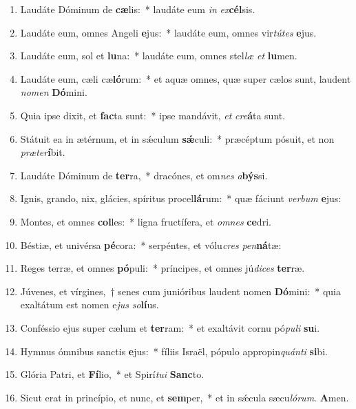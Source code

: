 \documentclass[twoside]{article}
\begin{document}
\begin{paracol}[1]{2}
\begin{enumerate}[wide, itemsep=0mm, labelwidth=!, labelindent=0pt, label=\color{gregoriocolor}\theenumi]
\item Laudáte Dóminum de \textbf{cæ}lis:~* laudáte eum \textit{in} \textit{ex}\textbf{cél}sis.
\item Laudáte eum, omnes Angeli \textbf{e}jus:~* laudáte eum, omnes vir\textit{tú}\textit{tes} \textbf{e}jus.
\item Laudáte eum, sol et \textbf{lu}na:~* laudáte eum, omnes stel\textit{læ} \textit{et} \textbf{lu}men.
\item Laudáte eum, cæli cæ\textbf{ló}rum:~* et aquæ omnes, quæ super cælos sunt, laudent \textit{no}\textit{men} \textbf{Dó}mini.
\item Quia ipse dixit, et \textbf{fac}ta sunt:~* ipse mandávit, \textit{et} \textit{cre}\textbf{á}ta sunt.
\item Státuit ea in ætérnum, et in sǽculum \textbf{sǽ}culi:~* præcéptum pósuit, et non \textit{præ}\textit{ter}\textbf{í}bit.
\item Laudáte Dóminum de \textbf{ter}ra,~* dracónes, et om\textit{nes} \textit{a}\textbf{býs}si.
\item Ignis, grando, nix, glácies, spíritus procel\textbf{lá}rum:~* quæ fáciunt \textit{ver}\textit{bum} \textbf{e}jus:
\item Montes, et omnes \textbf{col}les:~* ligna fructífera, et \textit{om}\textit{nes} \textbf{ce}dri.
\item Béstiæ, et univérsa \textbf{pé}cora:~* serpéntes, et vólu\textit{cres} \textit{pen}\textbf{ná}tæ:
\item Reges terræ, et omnes \textbf{pó}puli:~* príncipes, et omnes jú\textit{di}\textit{ces} \textbf{ter}ræ.
\item Júvenes, et vírgines,~† senes cum junióribus laudent nomen \textbf{Dó}mini:~* quia exaltátum est nomen e\textit{jus} \textit{so}\textbf{lí}us.
\item Conféssio ejus super cælum et \textbf{ter}ram:~* et exaltávit cornu pó\textit{pu}\textit{li} \textbf{su}i.
\item Hymnus ómnibus sanctis \textbf{e}jus:~* fíliis Israël, pópulo appropin\textit{quán}\textit{ti} \textbf{si}bi.
\item Glória Patri, et \textbf{Fí}lio,~* et Spirí\textit{tu}\textit{i} \textbf{Sanc}to.
\item Sicut erat in princípio, et nunc, et \textbf{sem}per,~* et in sǽcula sæcu\textit{ló}\textit{rum}. \textbf{A}men.
\end{enumerate}


\end{paracol}
\end{document}
